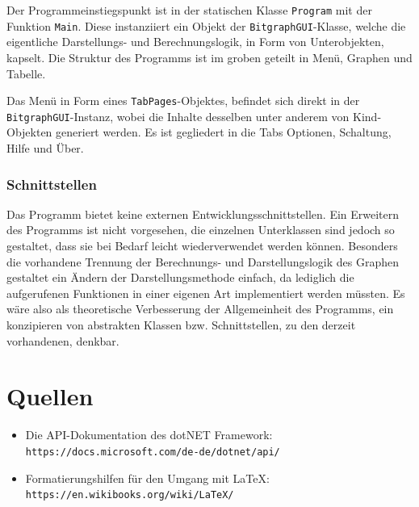 \documentclass[a4paper]{article}
\begin{document}
    Der Programmeinstiegspunkt ist in der statischen Klasse \verb|Program| mit der Funktion \verb|Main|.
    Diese instanziiert ein Objekt der \verb|BitgraphGUI|-Klasse, welche die eigentliche Darstellungs- und Berechnungslogik, in Form von Unterobjekten, kapselt.
    Die Struktur des Programms ist im groben geteilt in Menü, Graphen und Tabelle.

    Das Menü in Form eines \verb|TabPages|-Objektes, befindet sich direkt in der \verb|BitgraphGUI|-Instanz, wobei die Inhalte desselben unter anderem von Kind-Objekten generiert werden.
    Es ist gegliedert in die Tabs \glqq Optionen\grqq{}, \glqq Schaltung\grqq{}, \glqq Hilfe\grqq{} und \glqq Über\grqq{}.

    \subsubsection{Schnittstellen}

    Das Programm bietet keine externen Entwicklungsschnittstellen.
    Ein Erweitern des Programms ist nicht vorgesehen, die einzelnen Unterklassen sind jedoch so gestaltet, dass sie bei Bedarf leicht wiederverwendet werden können.
    Besonders die vorhandene Trennung der Berechnungs- und Darstellungslogik des Graphen gestaltet ein Ändern der Darstellungsmethode einfach, da lediglich die aufgerufenen Funktionen in einer eigenen Art implementiert werden müssten.
    Es wäre also als theoretische Verbesserung der Allgemeinheit des Programms, ein konzipieren von abstrakten Klassen bzw. Schnittstellen, zu den derzeit vorhandenen, denkbar.

\newpage
\section{Quellen}

\begin{itemize}
    \item
    Die API-Dokumentation des \glqq dotNET Framework\grqq{}:\\
    \verb|https://docs.microsoft.com/de-de/dotnet/api/|
    
    \item 
    Formatierungshilfen für den Umgang mit \LaTeX:\\
    \verb|https://en.wikibooks.org/wiki/LaTeX/|
\end{itemize}
\end{document}
